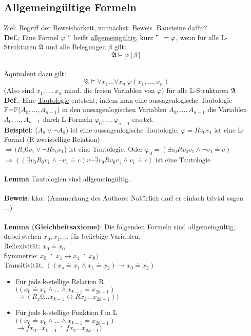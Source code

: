 \documentclass[a4paper]{scrartcl}
\begin{document}
\subsection{Allgemeingültige Formeln}
Ziel: Begriff der Beweisbarkeit, zunnächst: Beweis. Bausteine dafür?\\
\textbf{Def.}: Eine Formel $\varphi$ $"$ heißt \underline{allgemeingültig}, kurz $"~\models\varphi$, wenn für alle L-Strukturen $\mathfrak{A}$ und alle Belegungen $\beta$ gilt:\\
$$\mathfrak{A}\models \varphi[\beta]$$\\
Äquivalent dazu gilt:\\
$$\mathfrak{A}\models \forall x_1... \forall x_n ~\varphi(x_1,...,x_n)$$
(Also sind $x_1,...,x_n$ mind. die freien Variablen von $\varphi$) für alle L-Strukturen $\mathfrak{A}$ \\
\textbf{Def.}: Eine \underline{Tautologie} entsteht, indem man eine aussagenlogische Tautologie F=F($A_0,...,A_{n-1}$) in den aussagenlogischen Variablen $A_0,...,A_{n-1}$ die Variablen $A_0,...,A_{n-1}$ durch L-Formeln $\varphi_0,...,\varphi_{n-1}$ ersetzt.\\
\textbf{Beispiel:} ($A_0 \lor \neg A_0$) ist eine aussagenlogische Tautologie, $\varphi=Rv_0v_1$ ist eine L-Formel (R zweistellige Relation)\\
$\Rightarrow (R_v0v_1 \lor \neg Rv_0v_1$) ist eine Tautologie.
Oder $\varphi_0 =(\exists v_0 Rv_0v_1 \land \neg v_1 \doteq c)$\\
$\Rightarrow ((\exists v_0R_0v_1 \land \neg v_1 \doteq c) v\neg \exists v_0Rv_0v_1 \land v_1 \doteq c)$ ist eine Tautologie\\ \\
\textbf{Lemma} Tautologien sind allgemeingültig.\\ \\
\textbf{Beweis}: klar. (Annmerkung des Authors: Natürlich darf er einfach trivial sagen ...)\\ \\
\textbf{Lemma (Gleichheitsaxiome)}: Die folgenden Formeln sind allgemeingültig, dabei stehen $x_0,x_1,...$ für beliebige Variablen.\\
Reflexivität: $x_0 \doteq x_0$\\
Symmetrie: $x_0\doteq x_1 \leftrightarrow x_1 \doteq x_0)$\\
Transitivität. $((x_o\doteq x_1 \land x_1 \doteq x_2)\rightarrow x_0 \doteq x_2)$\\
\begin{itemize}
\item Für jede k-stellige Relation R\\
$((x_0\doteq x_k \land ... \land x_{k-1} \doteq x_{2k-1})$\\
$\rightarrow (R_x0...x_{k-1} \leftrightarrow Rx_k ... x_{2k-1}))$\\
\item Für jede k-stellige Funktion f in L\\
$((x_0 \doteq x_k \land ... \land x_{k-1} \doteq x_{2k-1})$\\
$\rightarrow f x_0 ... x_{k-1} \doteq f x_k... x_{2k-1})$
\end{itemize}
\end{document}
